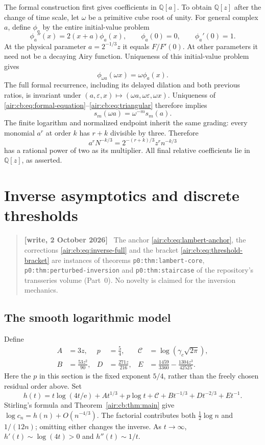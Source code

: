 \documentclass[11pt,letterpaper]{article}
\numberwithin{equation}{section}
\theoremstyle{remark}
\newcommand{\Q}{\mathbb{Q}}
\newcommand{\eps}{\varepsilon}
\newcommand{\ee}{\mathrm e}
\newenvironment{writenote}{\par\smallskip\begin{quote}\small\textbf{[write, 2 October 2026]}\ }{\end{quote}\smallskip}
\newcommand{\repopath}[1]{\nolinkurl{#1}}
\begin{document}
The formal construction first gives coefficients in $\Q[a]$. To obtain
$\Q[z]$ after the change of time scale, let $\omega$ be a primitive cube root
of unity. For general complex $a$, define $\phi_a$ by the entire initial-value
problem
\[
\phi_a''(x)=2(x+a)\phi_a(x),\qquad \phi_a(0)=0,\qquad\phi_a'(0)=1.
\]
At the physical parameter $a=2^{-1/3}z$ it equals $F/F'(0)$. At other
parameters it need not be a decaying Airy function. Uniqueness of this
initial-value problem gives
\[
\phi_{\omega a}(\omega x)=\omega\phi_a(x).
\]
The full formal recurrence, including its delayed dilation and both previous
ratios, is invariant under
$(a,\eps,x)\mapsto(\omega a,\omega\eps,\omega x)$. Uniqueness of
\eqref{air:cb:eq:formal-equation}--\eqref{air:cb:eq:triangular} therefore implies
\[
s_m(\omega a)=\omega^{-m}s_m(a).
\]
The finite logarithm and normalized endpoint inherit the same grading:
every monomial $a^r$ at order $k$ has $r+k$ divisible by three. Therefore
\[
a^rN^{-k/3}=2^{-(r+k)/3}z^rn^{-k/3}
\]
has a rational power of two as its multiplier. All final relative
coefficients lie in $\Q[z]$, as asserted.

\section{Inverse asymptotics and discrete thresholds}\label{air:cb:sec:inverse}
\begin{writenote}
The anchor \eqref{air:cb:eq:lambert-anchor}, the corrections \eqref{air:cb:eq:inverse-full} and the bracket \eqref{air:cb:eq:threshold-bracket} are instances of theorems \repopath{p0:thm:lambert-core}, \repopath{p0:thm:perturbed-inversion} and \repopath{p0:thm:staircase} of the repository's transseries volume (Part~0). No novelty is claimed for the inversion mechanics.
\end{writenote}


\subsection{The smooth logarithmic model}
Define
\begin{equation}\label{air:cb:eq:inverse-constants}
\begin{aligned}
A&=3z,&p&=\frac54,&\mathcal C&=\log(\gamma_c\sqrt{2\pi}),\\
B&=\frac{53z^2}{90},&D&=\frac{271z}{216},&
E&=\frac{1459}{3360}-\frac{1304z^3}{42525}.
\end{aligned}
\end{equation}
Here the $p$ in this section is the fixed exponent $5/4$, rather than the
freely chosen residual order above. Set
\begin{equation}\label{air:cb:eq:smooth-model}
h(t)=t\log(4t/\ee)+At^{1/3}+p\log t+\mathcal C
+Bt^{-1/3}+Dt^{-2/3}+Et^{-1}.
\end{equation}
Stirling's formula and Theorem~\ref{air:cb:thm:main} give
$\log c_n=h(n)+O(n^{-4/3})$. The factorial contributes both
$\tfrac12\log n$ and $1/(12n)$; omitting either changes the inverse.
As $t\to\infty$, $h'(t)\sim\log(4t)>0$ and $h''(t)\sim1/t$.
\end{document}
